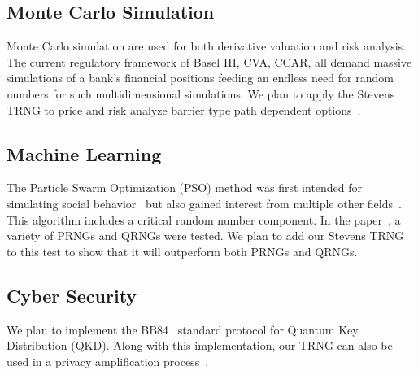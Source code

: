 \documentclass{article}
\begin{document}
    \subsection{Monte Carlo Simulation}
    Monte Carlo simulation are used for both derivative valuation and risk analysis. The current regulatory framework of Basel III, CVA, CCAR, all demand massive simulations of a bank's financial positions feeding an endless need for random numbers for such multidimensional simulations. We plan to apply the Stevens TRNG to price and risk analyze barrier type path dependent options~\citep{el1998simulating}.

    \subsection{Machine Learning}
    The Particle Swarm Optimization (PSO) method was first intended for simulating social behavior~\citep{kennedy1997particle} but also gained interest from multiple other fields~\citep{poli2007particle}. This algorithm includes a critical random number component. In the paper~\citep{ding2014comparison}, a variety of PRNGs and QRNGs were tested. We plan to add our Stevens TRNG to this test to show that it will outperform both PRNGs and QRNGs.

    \subsection{Cyber Security}
    We plan to implement the BB84~\citep{bennett1984quantum} standard protocol for Quantum Key Distribution (QKD). Along with this implementation, our TRNG can also be used in a privacy amplification process~\citep{bennett1995generalized}.


\clearpage{}


\end{document}
